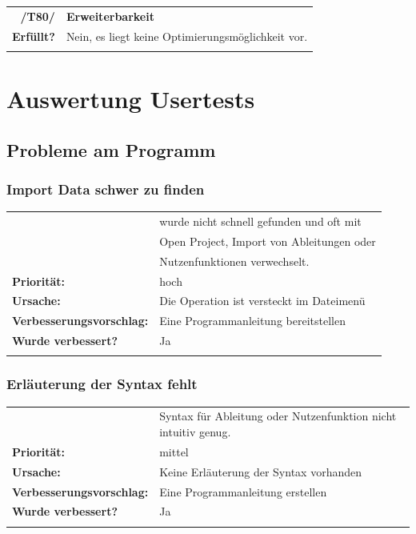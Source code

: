\documentclass{article}
\newcommand{\guibutton}[1]{\fbox{\texttt{#1}}}
\begin{document}
\begin{table}[H]
\begin{tabularx}{\textwidth}{rX}
\vspace{1mm}
\textbf{/T80/}         & \textbf{Erweiterbarkeit} \\ \vspace{1mm}
\textbf{Erfüllt?}  & Nein, es liegt keine Optimierungsmöglichkeit vor. \\ \vspace{1mm}
\end{tabularx}
\end{table}


\newpage
\section{Auswertung Usertests} \label{usertests}
\subsection{Probleme am Programm}

\subsubsection*{Import Data schwer zu finden}
\begin{tabular}{ll}
\begin{tabularx}{\textwidth}{rX}
    \textbf{Beschreibung:} & \guibutton{Import Data} wurde nicht schnell gefunden und oft mit \\
    & Open Project, Import von Ableitungen oder \\
    & Nutzenfunktionen verwechselt. \\
    \textbf{Priorität:} & hoch\\
    \textbf{Ursache:} & Die Operation ist versteckt im Dateimenü \\
    \textbf{Verbesserungsvorschlag:} & Eine Programmanleitung bereitstellen \\
    \textbf{Wurde verbessert?} & Ja\\
      \end{tabularx}
\end{tabular}

\subsubsection*{Erläuterung der Syntax fehlt}
\begin{tabular}{ll}
\begin{tabularx}{\textwidth}{rX}
    \textbf{Beschreibung:} & Syntax für Ableitung oder Nutzenfunktion nicht intuitiv genug.\\
    \textbf{Priorität:} & mittel\\
    \textbf{Ursache:} & Keine Erläuterung der Syntax vorhanden\\
    \textbf{Verbesserungsvorschlag:} & Eine Programmanleitung erstellen\\
    \textbf{Wurde verbessert?} & Ja\\
    \end{tabularx}
\end{tabular}
\end{document}
